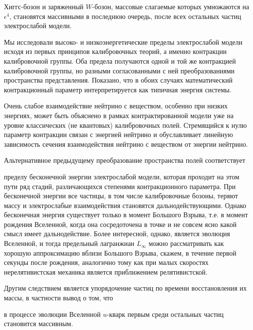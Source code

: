 Хиггс-бозон и заряженный $W$-бозон, массовые слагаемые которых умножаются на $\epsilon^4 $, становятся массивными в последнюю очередь, после всех остальных частиц электрослабой модели. 



\smallskip




Мы исследовали высоко- и низкоэнергетические пределы электрослабой модели исходя из первых принципов калибровочных теорий, а именно  контракции калибровочной группы. Оба предела получаются одной и той же контракцией калибровочной группы, но разными согласованными с ней преобразованиями пространства представления. Показано, что в обоих случаях математический контракционный параметр интерпретируется как типичная энергия системы.



Очень слабое взаимодействие нейтрино с веществом, особенно при низких энергиях, может быть объяснено в рамках контрактированной модели уже на уровне классических (не квантовых) калибровочных полей. Стремящийся к нулю параметр контракции связан с энергией нейтрино и обуславливает линейную зависимость сечения взаимодействия нейтрино с веществом от энергии нейтрино.



Альтернативное  предыдущему преобразование пространства полей соответствует %

пределу бесконечной энергии электрослабой модели, которая проходит на этом пути ряд стадий, различающихся степенями контракционного параметра. При бесконечной энергии все частицы, в том числе калибровочные бозоны, теряют массу и электрослабые взаимодействия становятся дальнодействующими. Однако бесконечная энергия существует только в момент Большого Взрыва, т.е. в момент рождения Вселенной, когда она сосредоточена в точке и не совсем ясно какой смысл имеет дальнодействие. Более интересной, однако, является эволюция Вселенной, и тогда предельный лагранжиан $L_{\infty}$ можно рассматривать как хорошую аппроксимацию вблизи Большого Взрыва, скажем, в течение первой секунды после рождения, аналогично тому как  при малых скоростях нерелятивистская механика является  приближением релятивистской. 

Другим следствием является упорядочение частиц по времени восстановления их массы, в частности вывод о том, что 

в процессе эволюции Вселенной $u$-кварк первым среди остальных частиц становится массивным. 



